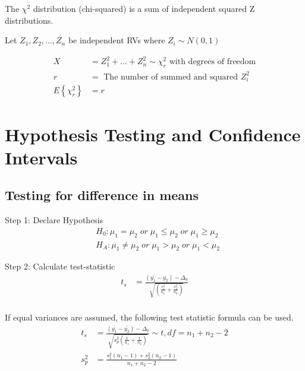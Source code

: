 \documentclass[10pt]{article}
\newcommand{\define}[1]{\colorbox{Thistle2}{#1}}
\newcommand{\mean}[1]{\mu_{#1}}
\renewcommand{\exp}[1]{E\left\{#1\right\}} %
\newcommand{\svar}[1]{s^2_{#1}} %
\begin{document}
\begin{multicols}{3}
    The \define{$\chi^2$ distribution} (chi-squared) is a sum of independent squared Z distributions.

    Let $Z_1, Z_2, \dots, Z_n$ be independent RVs where $Z_i \sim N(0,1)$

    \begin{align*}
        X              & = Z_1^2 + \dots + Z_n^2 \sim \chi_r^2 \text{ with degrees of freedom} \\
        r              & = \text{ The number of summed and squared } Z_i^2                     \\
        \exp{\chi_r^2} & = r
    \end{align*}

    \section{Hypothesis Testing and Confidence Intervals}

    \subsection{Testing for difference in means}

    Step 1: Declare Hypothesis
    \begin{align*}
         & H_0: \mean{1} = \mean{2} \;or\; \mean{1} \leq \mean{2} \;or\; \mean{1} \geq \mean{2} \\
         & H_A: \mean{1} \neq \mean{2} \;or\; \mean{1} > \mean{2} \;or\; \mean{1} < \mean{2}
    \end{align*}

    Step 2: Calculate test-statistic
    \begin{align*}
        t_s & = \frac{(\bar{y_1} - \bar{y_2}) - \Delta_0}{\sqrt{\left(\frac{\svar{1}}{n_1} + \frac{\svar{2}}{n_2}\right)}} \\
    \end{align*}

    If equal variances are assumed, the following test statistic formula can be used.
    \begin{align*}
        t_s      & = \frac{(\bar{y_1} - \bar{y_2}) - \Delta_0}{\sqrt{\svar{p} (\frac{1}{n_1} + \frac{1}{n_2})}} \sim t, df = n_1 + n_2 - 2 \\
        \svar{p} & = \frac{\svar{1} (n_1-1) + \svar{2} (n_2-1)}{n_1 + n_2 - 2}                                                             \\
    \end{align*}


\end{multicols}
\end{document}
